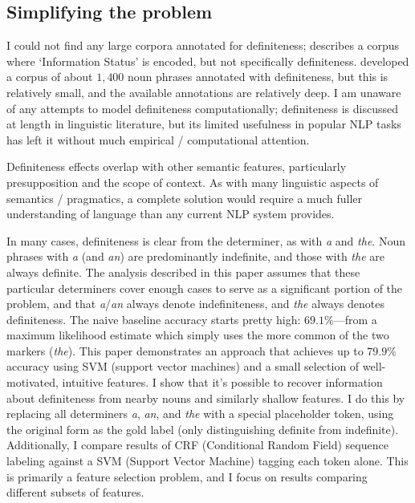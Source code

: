 \documentclass[11pt]{article}
\begin{document}
\subsection{Simplifying the problem}
I could not find any large corpora annotated for definiteness; \citet{calhoun:2010} describes a corpus where `Information Status' is encoded, but not specifically definiteness. \citet{vieira:2000} developed a corpus of about $1,400$ noun phrases annotated with definiteness, but this is relatively small, and the available annotations are relatively deep. I am unaware of any attempts to model definiteness computationally; definiteness is discussed at length in linguistic literature, but its limited usefulness in popular NLP tasks has left it without much empirical / computational attention.

Definiteness effects overlap with other semantic features, particularly presupposition and the scope of context. As with many linguistic aspects of semantics / pragmatics, a complete solution would require a much fuller understanding of language than any current NLP system provides.

In many cases, definiteness is clear from the determiner, as with \emph{a} and \emph{the}. Noun phrases with \emph{a} (and \emph{an}) are predominantly indefinite, and those with \emph{the} are always definite. The analysis described in this paper assumes that these particular determiners cover enough cases to serve as a significant portion of the problem, and that \emph{a}/\emph{an} always denote indefiniteness, and \emph{the} always denotes definiteness. The naive baseline accuracy starts pretty high: $69.1\%$---from a maximum likelihood estimate which simply uses the more common of the two markers (\emph{the}). This paper demonstrates an approach that achieves up to $79.9\%$ accuracy using SVM (support vector machines) and a small selection of well-motivated, intuitive features.
I show that it's possible to recover information about definiteness from nearby nouns and similarly shallow features. I do this by replacing all determiners \emph{a}, \emph{an}, and \emph{the} with a special placeholder token, using the original form as the gold label (only distinguishing definite from indefinite). Additionally, I compare results of CRF (Conditional Random Field) sequence labeling against a SVM (Support Vector Machine) tagging each token alone.
This is primarily a feature selection problem, and I focus on results comparing different subsets of features.
\end{document}
